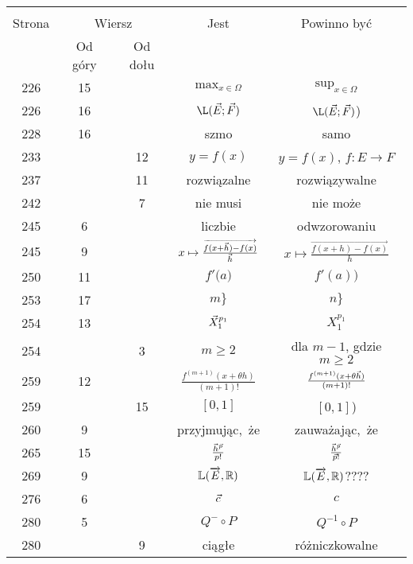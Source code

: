 \documentclass[a4paper,11pt]{article}
\numberwithin{equation}{section}
\begin{document}
\begin{center}
  \begin{tabular}{|c|c|c|c|c|}
    \hline
    & \multicolumn{2}{c|}{} & & \\
    Strona & \multicolumn{2}{c|}{Wiersz} & Jest
                              & Powinno być \\ \cline{2-3}
    & Od góry & Od dołu & & \\
    \hline
    226 & 15 & & $\max_{ x \in \Omega }$ & $\sup_{ x \in \Omega }$ \\
    226 & 16 & & $\L( \vec{ E }; \vec{ F } )$
           & $\L( \vec{ E }; \vec{ F } )$) \\
    228 & 16 & & szmo & samo \\
    233 & & 12 & $y = f( x )$ & $y = f( x )$, $f : E \to F$ \\
    237 & & 11 & rozwiązalne & rozwiązywalne \\
    242 & &  7 & nie musi & nie może \\
    245 &  6 & & liczbie & odwzorowaniu \\
    245 &  9 & & $x \mapsto
                 \frac{ \overrightarrow{ f( x + \vec{h} ) - f( x ) } }
                 { \vec{h} }$
           & $x \mapsto \frac{ \overrightarrow{ f( x + h ) - f( x ) } }{ h }$ \\
    250 & 11 & & $f'( a \Big)$ & $f'( a ) \Big)$ \\
    253 & 17 & & $m \}$ & $n \}$ \\
    254 & 13 & & $\vec{X}^{ p_{ 1 } }_{ 1 }$ & $X^{ p_{ 1 } }_{ 1 }$ \\
    254 & &  3 & $m \geq 2$ & dla $m - 1$, gdzie $m \geq 2$ \\
    259 & 12 & & $\frac{ f^{ ( m + 1 ) }( x + \theta h ) }{ ( m + 1 )! }$
           & $\frac{ f^{ ( m + 1 ) }( x + \theta \vec{h} ) }{ ( m + 1 )! }$
    \\
    259 & & 15 & $[ 0, 1 ]$ & $[ 0, 1 ]$) \\
    260 &  9 & & przyjmując,~że & zauważając,~że \\
    265 & 15 & & $\frac{ \vec{h}^{ \vec{p} } }{ p! }$
           & $\frac{ \vec{h}^{ \vec{p} } }{ \vec{p}! }$ \\
    269 &  9 & & $\mathbb{L}( \overrightarrow{ E }, \mathbb{R} )$
           & $\mathbb{L}( \overrightarrow{ E }, \mathbb{R} )$???? \\
    276 &  6 & & $\vec{c}$ & $c$ \\
    280 &  5 & & $Q^{ - } \circ P$ & $Q^{ -1 } \circ P$ \\
    280 & &  9 & ciągłe & różniczkowalne \\

\end{tabular}
\end{center}
\end{document}
